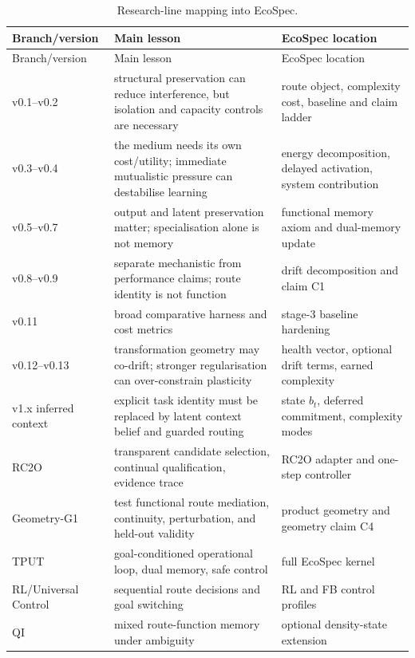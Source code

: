\documentclass[10pt]{article}
\begin{document}
\begin{longtable}{p{}p{}p{}}
\caption{Research-line mapping into EcoSpec.}\label{tab:history}\\
\toprule
Branch/version & Main lesson & EcoSpec location \\
\midrule
\endfirsthead
\toprule
Branch/version & Main lesson & EcoSpec location \\
\midrule
\endhead
v0.1--v0.2 & structural preservation can reduce interference, but isolation and capacity controls are necessary & route object, complexity cost, baseline and claim ladder \\
v0.3--v0.4 & the medium needs its own cost/utility; immediate mutualistic pressure can destabilise learning & energy decomposition, delayed activation, system contribution \\
v0.5--v0.7 & output and latent preservation matter; specialisation alone is not memory & functional memory axiom and dual-memory update \\
v0.8--v0.9 & separate mechanistic from performance claims; route identity is not function & drift decomposition and claim C1 \\
v0.11 & broad comparative harness and cost metrics & stage-3 baseline hardening \\
v0.12--v0.13 & transformation geometry may co-drift; stronger regularisation can over-constrain plasticity & health vector, optional drift terms, earned complexity \\
v1.x inferred context & explicit task identity must be replaced by latent context belief and guarded routing & state $b_t$, deferred commitment, complexity modes \\
RC2O & transparent candidate selection, continual qualification, evidence trace & RC2O adapter and one-step controller \\
Geometry-G1 & test functional route mediation, continuity, perturbation, and held-out validity & product geometry and geometry claim C4 \\
TPUT & goal-conditioned operational loop, dual memory, safe control & full EcoSpec kernel \\
RL/Universal Control & sequential route decisions and goal switching & RL and FB control profiles \\
QI & mixed route-function memory under ambiguity & optional density-state extension \\
\bottomrule
\end{longtable}
\end{document}
